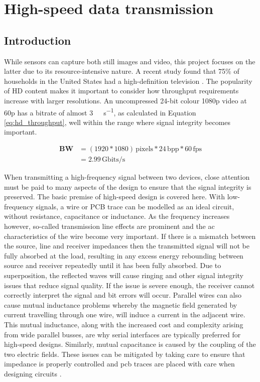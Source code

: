 \chapter{High-speed data transmission}

\section{Introduction}

While sensors can capture both still images and video, this project focuses on the latter due to its resource-intensive nature. A recent study found that 75\% of households in the United States had a high-definition television \cite{14_leichtman_research_group_2013}. The popularity of HD content makes it important to consider how throughput requirements increase with larger resolutions. An uncompressed 24-bit colour 1080p video at 60p has a bitrate of almost \SI{3}{\giga\bit\per\second}, as calculated in Equation \ref{eq:hd_throughput}, well within the range where signal integrity becomes important.

\begin{equation}
  \begin{split}
    \mathbf{BW} &= (1920*1080) \, \mathrm{pixels} * 24  \, \mathrm{bpp} * 60 \, \mathrm{fps} \\
                &= 2.99  \, \mathrm{Gbits/s}
  \end{split}  
  \label{eq:hd_throughput}
\end{equation}

When transmitting a high-frequency signal between two devices, close attention must be paid to many aspects of the design to ensure that the signal integrity is preserved. The basic premise of high-speed design is covered here. With low-frequency signals, a wire or PCB trace can be modelled as an ideal circuit, without resistance, capacitance or inductance. As the frequency increases however, so-called transmission line effects are prominent and the \gls{ac} characteristics of the wire become very important. If there is a mismatch between the source, line and receiver impedances then the transmitted signal will not be fully absorbed at the load, resulting in any excess energy rebounding between source and receiver repeatedly until it has been fully absorbed. Due to superposition, the reflected waves will cause ringing and other signal integrity issues that reduce signal quality. If the issue is severe enough, the receiver cannot correctly interpret the signal and bit errors will occur. Parallel wires can also cause mutual inductance problems whereby the magnetic field generated by current travelling through one wire, will induce a current in the adjacent wire. This mutual inductance, along with the increased cost and complexity arising from wide parallel busses, are why serial interfaces are typically preferred for high-speed designs. Similarly, mutual capacitance is caused by the coupling of the two electric fields. These issues can be mitigated by taking care to ensure that impedance is properly controlled and \gls{pcb} traces are placed with care when designing circuits \cite{15_basic_principles_of_signal_integrity_2007}.

